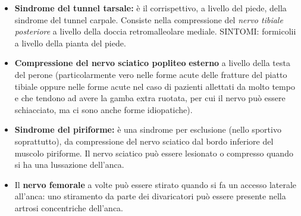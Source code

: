\begin{itemize}
\item
  \textbf{Sindrome del tunnel tarsale:} è il corrispettivo, a livello del piede, della sindrome del tunnel carpale. Consiste nella compressione del \emph{nervo tibiale posteriore} a livello della doccia retromalleolare mediale.
SINTOMI: formicolii a livello della pianta del piede.
\item
  \textbf{Compressione del nervo sciatico popliteo} \textbf{esterno} a livello della testa del perone (particolarmente vero nelle forme acute delle fratture del piatto tibiale oppure nelle forme acute nel caso di pazienti allettati da molto tempo e che tendono ad avere la gamba extra ruotata, per cui il nervo può essere schiacciato, ma ci sono anche forme idiopatiche).
\item
  \textbf{Sindrome del piriforme:} è una sindrome per esclusione (nello sportivo soprattutto), da compressione del nervo sciatico dal bordo inferiore del muscolo piriforme. Il nervo sciatico può essere lesionato o compresso quando si ha una lussazione dell'anca.
\item
  Il \textbf{nervo femorale} a volte può essere stirato quando si fa un accesso laterale all'anca: uno stiramento da parte dei divaricatori può essere presente nella artrosi concentriche dell'anca.
\end{itemize}
